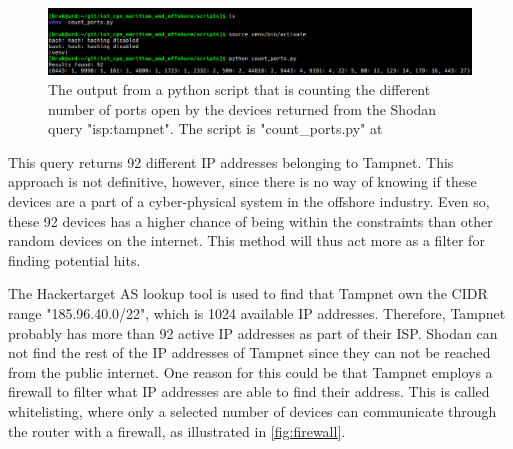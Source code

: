 \begin{figure} [H]
    \centering
    \includegraphics[scale=0.35]{Figurer/python_ports.png}
    \caption{The output from a python script that is counting the different number of ports open by the devices returned from the Shodan query "isp:tampnet". The script is "count\_ports.py" at \cite{scripts}}
    \label{fig:tampnet_ports}
\end{figure}

This query returns 92 different IP addresses belonging to Tampnet. This approach is not definitive, however, since there is no way of knowing if these devices are a part of a cyber-physical system in the offshore industry. Even so, these 92 devices has a higher chance of being within the constraints than other random devices on the internet. This method will thus act more as a filter for finding potential hits. 

The Hackertarget AS lookup tool \cite{asip_lookup} is used to find that Tampnet own the CIDR range "185.96.40.0/22", which is 1024 available IP addresses. \cite{CIDR_table} Therefore, Tampnet probably has more than 92 active IP addresses as part of their ISP. Shodan can not find the rest of the IP addresses of Tampnet since they can not be reached from the public internet. One reason for this could be that Tampnet employs a firewall to filter what IP addresses are able to find their address. This is called whitelisting, where only a selected number of devices can communicate through the router with a firewall, as illustrated in \cref{fig:firewall}.


